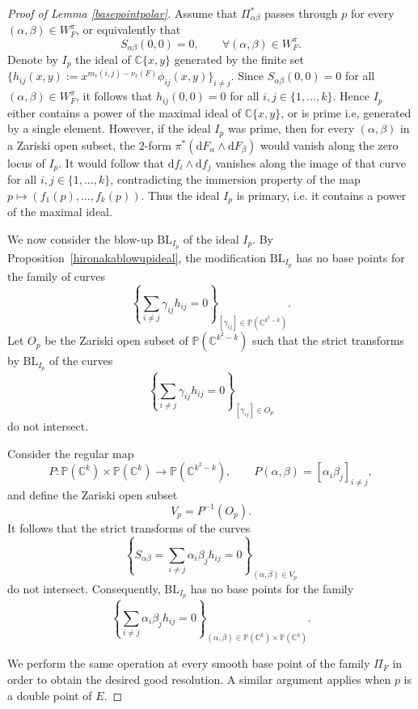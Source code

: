 \documentclass[reqno,dvipsnames,12pt]{amsart}
\begin{document}
\begin{proof}[Proof of Lemma \ref{basepointpolar}]
 Assume that \(\Pi_{\alpha \beta}^*\) passes through \(p\) for every \((\alpha,\beta)\in W_F^\pi\), or equivalently that
\[
S_{\alpha\beta}(0,0)=0,\qquad \forall (\alpha,\beta)\in W_F^\pi.
\]
Denote by \(I_p\) the ideal of \(\mathbb{C}\{x,y\}\) generated by the finite set
$
\{h_{ij}(x,y):=x^{m_v(i,j)-\nu_v(F)}\phi_{ij}(x,y)\}_{i\neq j}.
$
Since \(S_{\alpha\beta}(0,0)=0\) for all \((\alpha,\beta)\in W_F^\pi\), it follows that $h_{ij}(0,0)=0$
for all \(i,j\in\{1,\dots,k\}\). Hence \(I_p\) either contains a power of the maximal ideal of \(\mathbb{C}\{x,y\}\), or is prime i.e, generated by a single element. However, if the ideal \(I_p\) was prime, then for every \((\alpha,\beta)\) in a Zariski open subset, the \(2\)-form $\pi^*(\mathrm{d}F_\alpha\wedge \mathrm{d}F_\beta)$
would vanish along the zero locus of \(I_p\). It would follow that $\mathrm{d}f_i\wedge \mathrm{d}f_j$
vanishes along the image of that curve for all \(i,j\in\{1,\dots,k\}\), contradicting the immersion property of the map $p\longmapsto (f_1(p),\dots,f_k(p)).$
Thus the ideal \(I_p\) is primary, i.e. it contains a power of the maximal ideal.

We now consider the blow-up \(\mathrm{BL}_{I_p}\) of the ideal \(I_p\). By Proposition~\ref{hironakablowupideal}, the modification \(\mathrm{BL}_{I_p}\) has no base points for the family of curves
\[
\left\{\sum_{i\neq j}\gamma_{ij}h_{ij}=0\right\}_{[\gamma_{ij}]\in\mathbb{P}(\mathbb{C}^{k^2-k})}.
\]
Let \(O_p\) be the Zariski open subset of \(\mathbb{P}(\mathbb{C}^{k^2-k})\) such that the strict transforms by \(\mathrm{BL}_{I_p}\) of the curves
\[
\left\{\sum_{i\neq j}\gamma_{ij}h_{ij}=0\right\}_{[\gamma_{ij}]\in O_p}
\]
do not intersect.

Consider the regular map
\[
P:\mathbb{P}(\mathbb{C}^k)\times \mathbb{P}(\mathbb{C}^k)
\longrightarrow
\mathbb{P}(\mathbb{C}^{k^2-k}),
\qquad
P(\alpha,\beta)=[\alpha_i\beta_j]_{i\neq j},
\]
and define the Zariski open subset
\[
V_p=P^{-1}(O_p).
\]
It follows that the strict transforms of the curves
\[
\left\{
S_{\alpha\beta}
=
\sum_{i\neq j}\alpha_i\beta_j h_{ij}
=
0
\right\}_{(\alpha,\beta)\in V_p}
\]
do not intersect. Consequently, \(\mathrm{BL}_{I_p}\) has no base points for the family
\[
\left\{
\sum_{i\neq j}\alpha_i\beta_j h_{ij}=0
\right\}_{(\alpha,\beta)\in
\mathbb{P}(\mathbb{C}^k)\times\mathbb{P}(\mathbb{C}^k)}.
\]

We perform the same operation at every smooth base point of the family \(\Pi_F\) in order to obtain the desired good resolution. A similar argument applies when \(p\) is a double point of \(E\).
\end{proof}
\end{document}
